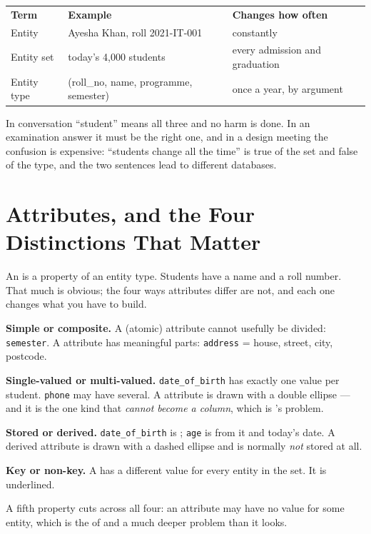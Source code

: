 \begin{examplebox}
\begin{tabular}{@{}L{3.6cm}L{5.0cm}L{5.4cm}@{}}
\textbf{Term} & \textbf{Example} & \textbf{Changes how often} \\
Entity        & Ayesha Khan, roll 2021-IT-001 & constantly \\
Entity set    & today's 4{,}000 students      & every admission and graduation \\
Entity type   & (roll\_no, name, programme, semester)
                                              & once a year, by argument \\
\end{tabular}

\smallskip
In conversation ``student'' means all three and no harm is done. In an
examination answer it must be the right one, and in a design meeting the
confusion is expensive: ``students change all the time'' is true of the set
and false of the type, and the two sentences lead to different databases.
\end{examplebox}

\section{Attributes, and the Four Distinctions That Matter}

An  is a property of an entity type. Students have a name and
a roll number. That much is obvious; the four ways attributes differ are not,
and each one changes what you have to build.

\begin{definitionbox}
\textbf{Simple or composite.} A  (atomic) attribute cannot
usefully be divided: \texttt{semester}. A  attribute has
meaningful parts: \texttt{address} = house, street, city, postcode.

\smallskip
\textbf{Single-valued or multi-valued.} \texttt{date\_of\_birth} has exactly
one value per student. \texttt{phone} may have several. A 
attribute is drawn with a double ellipse --- and it is the one kind that
\emph{cannot become a column}, which is 's problem.

\smallskip
\textbf{Stored or derived.} \texttt{date\_of\_birth} is ;
\texttt{age} is  from it and today's date. A derived attribute
is drawn with a dashed ellipse and is normally \emph{not} stored at all.

\smallskip
\textbf{Key or non-key.} A  has a different value for
every entity in the set. It is underlined.

\smallskip
A fifth property cuts across all four: an attribute may have no value for some
entity, which is the  of  and a much deeper problem
than it looks.
\end{definitionbox}


